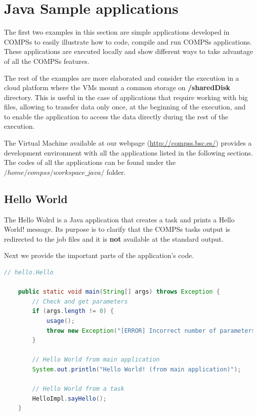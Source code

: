 \section{Java Sample applications}
\label{sec:JavaSampleApps}

The first two examples in this section are simple applications developed in COMPSs to easily illustrate how to code,
compile and run COMPSs applications. These applications are executed locally and show different ways to take advantage
of all the COMPSs features. 

The rest of the examples are more elaborated and consider the execution in a cloud platform where the VMs mount a common 
storage on \textbf{/sharedDisk} directory. This is useful in the case of applications that require working 
with big files, allowing to transfer data only once, at the beginning of the execution, and to enable 
the application to access the data directly during the rest of the execution.

The Virtual Machine available at our webpage (\url{http://compss.bsc.es/}) provides a development environment with
all the applications listed in the following sections. The codes of all the applications can be found under the 
$/home/compss/workspace\_java/$ folder. 

\subsection{Hello World}
The Hello Wolrd is a Java application that creates a task and prints a Hello World! message. Its purpose is to clarify that the COMPSs tasks output is
redirected to the job files and it is \textbf{not} available at the standard output. 

Next we provide the important parts of the application's code.

\begin{lstlisting}[language=java]
	// hello.Hello
	
	public static void main(String[] args) throws Exception {
		// Check and get parameters
		if (args.length != 0) {
			usage();
			throw new Exception("[ERROR] Incorrect number of parameters");
		}
		
		// Hello World from main application
		System.out.println("Hello World! (from main application)");

		// Hello World from a task
		HelloImpl.sayHello();
	}
\end{lstlisting}

